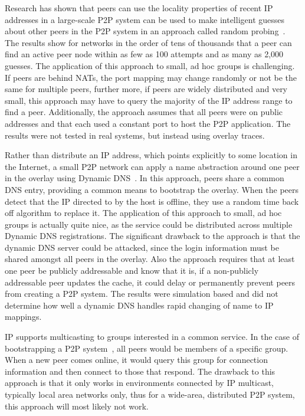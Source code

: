 \documentclass[conference]{IEEEtran}
\begin{document}
Research has shown that peers can use the locality properties of recent IP
addresses in a large-scale P2P system can be used to make intelligent guesses
about other peers in the P2P system in an approach called random
probing~\cite{bootstrapping_p2p, locality_aware}.  The results show for
networks in the order of tens of thousands that a peer can find an active peer
node within as few as 100 attempts and as many as 2,000 guesses.  The
application of this approach to small, ad hoc groups is challenging.  If peers
are behind NATs, the port mapping may change randomly or not be the same for
multiple peers, further more, if peers are widely distributed and very small,
this approach may have to query the majority of the IP address range to find a
peer.  Additionally, the approach assumes that all peers were on public
addresses and that each used a constant port to host the P2P application.  The
results were not tested in real systems, but instead using overlay traces.

Rather than distribute an IP address, which points explicitly to some location
in the Internet, a small P2P network can apply a name abstraction around one
peer in the overlay using Dynamic DNS~\cite{bootstrapping_ddns}.  In this
approach, peers share a common DNS entry, providing a common means to bootstrap
the overlay.  When the peers detect that the IP directed to by the host is
offline, they use a random time back off algorithm to replace it.  The
application of this approach to small, ad hoc groups is actually quite nice, as
the service could be distributed across multiple Dynamic DNS registrations.
The significant drawback to the approach is that the dynamic DNS server could
be attacked, since the login information must be shared amongst all peers in
the overlay.  Also the approach requires that at least one peer be publicly
addressable and know that it is, if a non-publicly addressable peer updates the
cache, it could delay or permanently prevent peers from creating a P2P system.
The results were simulation based and did not determine how well a dynamic DNS
handles rapid changing of name to IP mappings.

IP supports multicasting to groups interested in a common service.  In the case
of bootstrapping a P2P system~\cite{pastry, locality_aware}, all peers would be
members of a specific group.  When a new peer comes online, it would query this
group for connection information and then connect to those that respond.  The
drawback to this approach is that it only works in environments connected by IP
multicast, typically local area networks only, thus for a wide-area,
distributed P2P system, this approach will most likely not work.
\end{document}
